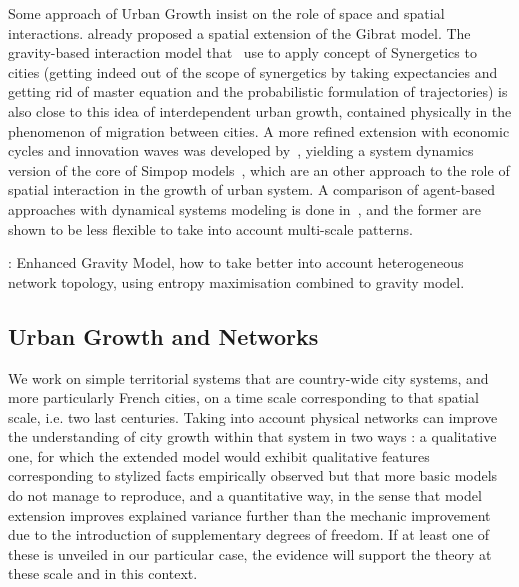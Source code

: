 \documentclass[Royal,sageh,times]{sagej}
\begin{document}
Some approach of Urban Growth insist on the role of space and spatial interactions. \cite{bretagnolle2000long} already proposed a spatial extension of the Gibrat model. The gravity-based interaction model that~\cite{sanders1992systeme} use to apply concept of Synergetics to cities (getting indeed out of the scope of synergetics by taking expectancies and getting rid of master equation and the probabilistic formulation of trajectories) is also close to this idea of interdependent urban growth, contained physically in the phenomenon of migration between cities. A more refined extension with economic cycles and innovation waves was developed by~\cite{favaro2011gibrat}, yielding a system dynamics version of the core of Simpop models~\cite{pumain2012multi}, which are an other approach to the role of spatial interaction in the growth of urban system. A comparison of agent-based approaches with dynamical systems modeling is done in~\cite{pumain2013theoretical}, and the former are shown to be less flexible to take into account multi-scale patterns.



\cite{2015arXiv150600348A} : Enhanced Gravity Model, how to take better into account heterogeneous network topology, using entropy maximisation combined to gravity model.


\subsection*{Urban Growth and Networks}







We work on simple territorial systems that are country-wide city systems, and more particularly French cities, on a time scale corresponding to that spatial scale, i.e. two last centuries. Taking into account physical networks can improve the understanding of city growth within that system in two ways : a qualitative one, for which the extended model would exhibit qualitative features corresponding to stylized facts empirically observed but that more basic models do not manage to reproduce, and a quantitative way, in the sense that model extension improves explained variance further than the mechanic improvement due to the introduction of supplementary degrees of freedom. If at least one of these is unveiled in our particular case, the evidence will support the theory at these scale and in this context.
\end{document}
